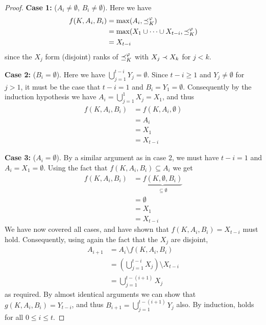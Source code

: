 \begin{proof}
    \textbf{Case 1:} ($A_i \ne \emptyset$, $B_i \ne \emptyset$). Here we have
    \begin{align*}
        f(K, A_i, B_i)
        &= \max(A_i, {\preceq_K^\varphi}) \\
        &= \max(X_1 \cup \cdots \cup X_{t-i}, {\preceq_K^\varphi}) \\
        &= X_{t-i}
    \end{align*}
    since the $X_j$ form (disjoint) ranks of ${\preceq_K^\varphi}$ with $X_{j} \prec
    X_{k}$ for $j < k$.

    \textbf{Case 2:} ($B_i = \emptyset$). Here we have
    $\bigcup_{j=1}^{t-i}{Y_j} = \emptyset$. Since $t - i \ge 1$ and $Y_j \ne
    \emptyset$ for $j > 1$, it must be the case that $t - i = 1$ and $B_i = Y_1
    = \emptyset$. Consequently by the induction hypothesis we have $A_i =
    \bigcup_{j=1}^{1}{X_j} = X_1$, and thus
    \begin{align*}
        f(K, A_i, B_i)
        &= f(K, A_i, \emptyset) \\
        &= A_i \\
        &= X_1 \\
        &= X_{t-i}
    \end{align*}

    \textbf{Case 3:} ($A_i = \emptyset$). By a similar argument as in case 2,
    we must have $t - i = 1$ and $A_i = X_1 = \emptyset$. Using the fact that
    $f(K, A_i, B_i) \subseteq A_i$ we get
    \begin{align*}
        f(K, A_i, B_i)
        &= \underbrace{f(K, \emptyset, B_i)}_{\subseteq \emptyset} \\
        &= \emptyset \\
        &= X_1 \\
        &= X_{t-i}
    \end{align*}
    We have now covered all cases, and have shown that $f(K, A_i, B_i) =
    X_{t-i}$ must hold. Consequently, using again the fact that the $X_j$ are
    disjoint,
    \begin{align*}
        A_{i+1}
        &= A_i \setminus f(K, A_i, B_i) \\
        &= \left(\bigcup_{j=1}^{t-i}{X_j}\right) \setminus X_{t-i} \\
        &= \bigcup_{j=1}^{t-(i+1)}{X_j}
    \end{align*}
    as required. By almost identical arguments we can show that $g(K, A_i, B_i)
    = Y_{t-i}$, and thus $B_{i+1} = \bigcup_{j=1}^{t-(i+1)}{Y_j}$ also. By
    induction,  holds for all $0 \le i \le t$.


\end{proof}
